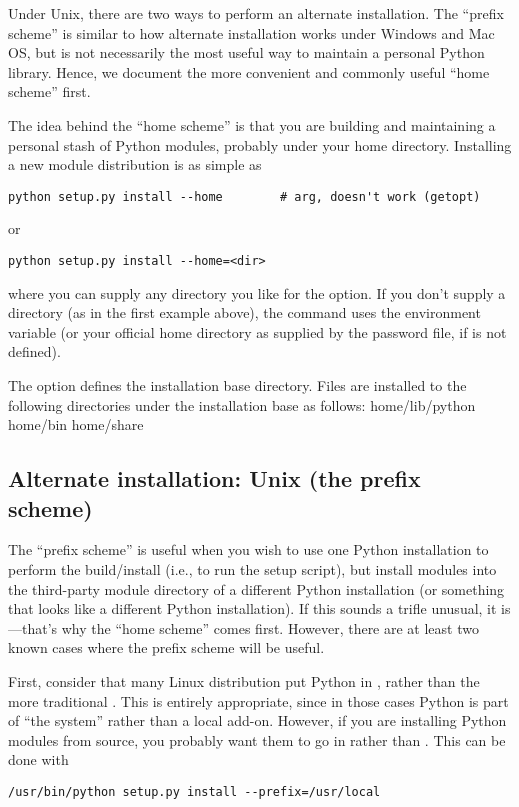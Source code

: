 \documentclass{howto}
\begin{document}
Under Unix, there are two ways to perform an alternate installation.
The ``prefix scheme'' is similar to how alternate installation works
under Windows and Mac OS, but is not necessarily the most useful way to
maintain a personal Python library.  Hence, we document the more
convenient and commonly useful ``home scheme'' first.

The idea behind the ``home scheme'' is that you are building and
maintaining a personal stash of Python modules, probably under your home 
directory.  Installing a new module distribution is as simple as
\begin{verbatim}
python setup.py install --home        # arg, doesn't work (getopt)
\end{verbatim}
or
\begin{verbatim}
python setup.py install --home=<dir>
\end{verbatim}
where you can supply any directory you like for the 
option.  If you don't supply a directory (as in the first example
above), the  command uses the  environment
variable (or your official home directory as supplied by the password
file, if  is not defined).

The  option defines the installation base directory.  Files
are installed to the following directories under the installation base
as follows:
              {home}{/lib/python}
              {home}{/bin}
              {home}{/share}

\subsection{Alternate installation: Unix (the prefix scheme)}
\label{sec:alt-unix-home}

The ``prefix scheme'' is useful when you wish to use one Python
installation to perform the build/install (i.e., to run the setup
script), but install modules into the third-party module directory of a
different Python installation (or something that looks like a different
Python installation).  If this sounds a trifle unusual, it is---that's
why the ``home scheme'' comes first.  However, there are at least two
known cases where the prefix scheme will be useful.

First, consider that many Linux distribution put Python in ,
rather than the more traditional .  This is entirely
appropriate, since in those cases Python is part of ``the system''
rather than a local add-on.  However, if you are installing Python
modules from source, you probably want them to go in
 rather than
.  This can be done with
\begin{verbatim}
/usr/bin/python setup.py install --prefix=/usr/local
\end{verbatim}
\end{document}
